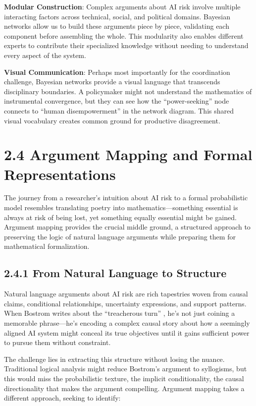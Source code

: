 \documentclass[
  11pt,
  letterpaper,
]{book}
\begin{document}
\textbf{Modular Construction}: Complex arguments about AI risk involve
multiple interacting factors across technical, social, and political
domains. Bayesian networks allow us to build these arguments piece by
piece, validating each component before assembling the whole. This
modularity also enables different experts to contribute their
specialized knowledge without needing to understand every aspect of the
system.

\textbf{Visual Communication}: Perhaps most importantly for the
coordination challenge, Bayesian networks provide a visual language that
transcends disciplinary boundaries. A policymaker might not understand
the mathematics of instrumental convergence, but they can see how the
``power-seeking'' node connects to ``human disempowerment'' in the
network diagram. This shared visual vocabulary creates common ground for
productive disagreement.

\section{2.4 Argument Mapping and Formal
Representations}\label{sec-argument-mapping}

The journey from a researcher's intuition about AI risk to a formal
probabilistic model resembles translating poetry into
mathematics---something essential is always at risk of being lost, yet
something equally essential might be gained. Argument mapping provides
the crucial middle ground, a structured approach to preserving the logic
of natural language arguments while preparing them for mathematical
formalization.

\subsection{2.4.1 From Natural Language to
Structure}\label{sec-natural-to-structure}

Natural language arguments about AI risk are rich tapestries woven from
causal claims, conditional relationships, uncertainty expressions, and
support patterns. When Bostrom writes about the ``treacherous turn''
\textcite{bostrom2014}, he's not just coining a memorable phrase---he's
encoding a complex causal story about how a seemingly aligned AI system
might conceal its true objectives until it gains sufficient power to
pursue them without constraint.

The challenge lies in extracting this structure without losing the
nuance. Traditional logical analysis might reduce Bostrom's argument to
syllogisms, but this would miss the probabilistic texture, the implicit
conditionality, the causal directionality that makes the argument
compelling. Argument mapping takes a different approach, seeking to
identify:
\end{document}
